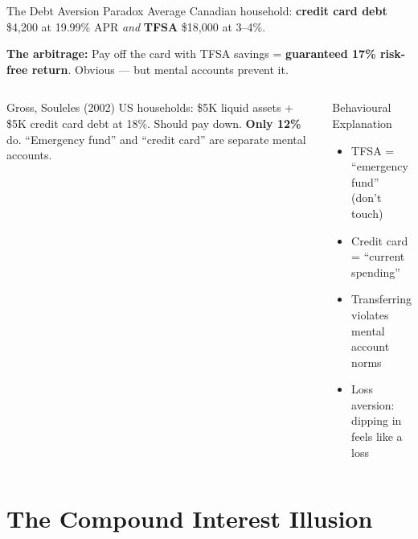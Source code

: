 \documentclass[aspectratio=169]{beamer}
\begin{document}
\begin{frame}{The Debt Aversion Paradox}
Average Canadian household: \textbf{credit card debt} \$4,200 at 19.99\% APR \textit{and} \textbf{TFSA} \$18,000 at 3--4\%.

\textbf{The arbitrage:} Pay off the card with TFSA savings = \textbf{guaranteed 17\% risk-free return}. Obvious --- but mental accounts prevent it.
\begin{columns}
\begin{exampleblock}{Gross, Souleles (2002)}
US households: \$5K liquid assets + \$5K credit card debt at 18\%. Should pay down. \textbf{Only 12\%} do. ``Emergency fund'' and ``credit card'' are separate mental accounts.
\end{exampleblock}
\begin{block}{Behavioural Explanation}
\begin{itemize}\small
  \item TFSA = ``emergency fund'' (don't touch)
  \item Credit card = ``current spending''
  \item Transferring violates mental account norms
  \item Loss aversion: dipping in feels like a loss
\end{itemize}
\end{block}
\end{columns}
\end{frame}

\section{The Compound Interest Illusion}
\end{document}
